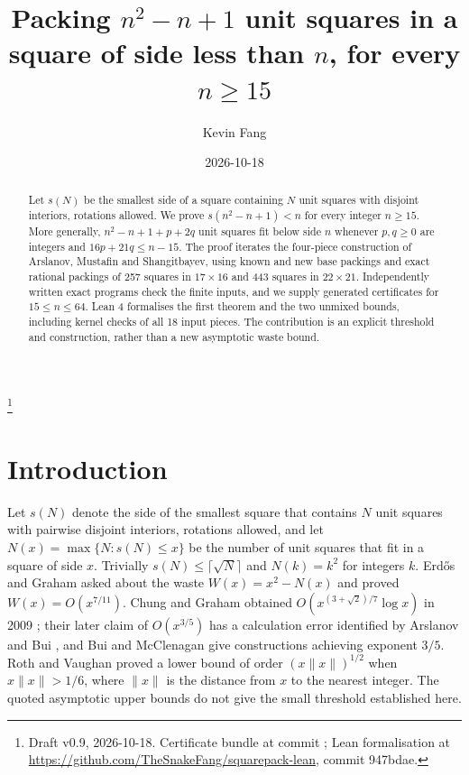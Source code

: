 \documentclass[11pt,letterpaper]{amsart}
\theoremstyle{plain}
\begin{document}
\title[Packing $n^2 - n + 1$ unit squares in a square of side less than $n$]{Packing $n^2 - n + 1$ unit squares in a square of side less than $n$, for every $n \ge 15$}
\author{Kevin Fang}
\date{2026-10-18}
\thanks{Draft v0.9, 2026-10-18. Certificate bundle \cite{Fan26} at commit ; Lean formalisation \cite{FanL26} at \url{https://github.com/TheSnakeFang/squarepack-lean}, commit 947bdae.}

\begin{abstract}
Let $s(N)$ be the smallest side of a square containing $N$ unit squares with disjoint interiors, rotations allowed. We prove $s(n^2-n+1)<n$ for every integer $n\ge15$. More generally, $n^2-n+1+p+2q$ unit squares fit below side $n$ whenever $p,q\ge0$ are integers and $16p+21q\le n-15$. The proof iterates the four-piece construction of Arslanov, Mustafin and Shangitbayev, using known and new base packings and exact rational packings of 257 squares in $17\times16$ and 443 squares in $22\times21$. Independently written exact programs check the finite inputs, and we supply generated certificates for $15\le n\le64$. Lean 4 formalises the first theorem and the two unmixed bounds, including kernel checks of all 18 input pieces. The contribution is an explicit threshold and construction, rather than a new asymptotic waste bound.
\end{abstract}

\maketitle

\section{Introduction}

Let $s(N)$ denote the side of the smallest square that contains $N$ unit squares with pairwise disjoint interiors, rotations allowed, and let $N(x) = \max\{N : s(N) \le x\}$ be the number of unit squares that fit in a square of side $x$. Trivially $s(N) \le \lceil \sqrt N \rceil$ and $N(k) = k^2$ for integers $k$. Erd\H{o}s and Graham \cite{EG75} asked about the waste $W(x) = x^2 - N(x)$ and proved $W(x) = O(x^{7/11})$. Chung and Graham obtained $O(x^{(3+\sqrt 2)/7}\log x)$ in 2009 \cite{CG09}; their later claim of $O(x^{3/5})$ \cite{CG20} has a calculation error identified by Arslanov and Bui \cite{AB26}, and Bui \cite{Bui25} and McClenagan \cite{McC26} give constructions achieving exponent $3/5$. Roth and Vaughan \cite{RV78} proved a lower bound of order $(x\lVert x \rVert)^{1/2}$ when $x\lVert x\rVert > 1/6$, where $\lVert x \rVert$ is the distance from $x$ to the nearest integer. The quoted asymptotic upper bounds do not give the small threshold established here.
\end{document}
